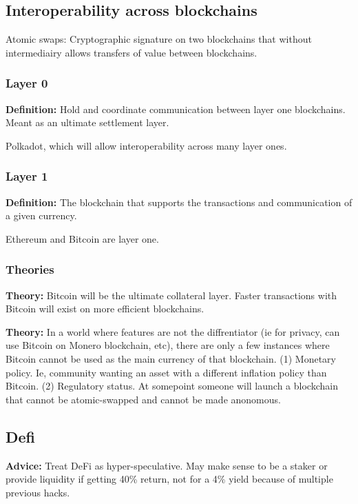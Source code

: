 \documentclass[10pt,twocolumn]{article}
\begin{document}
\subsection{Interoperability across blockchains}
Atomic swaps: Cryptographic signature on two blockchains that without
intermediairy allows transfers of value between blockchains. 

\subsubsection{Layer 0}
\textbf{Definition:} Hold and coordinate communication between layer one
blockchains. Meant as an ultimate settlement layer. 

Polkadot, which will allow interoperability across many layer ones. 

\subsubsection{Layer 1}
\textbf{Definition:} The blockchain that supports the transactions and
communication of a given currency. 

Ethereum and Bitcoin are layer one. 

\subsubsection{Theories}
{\bf Theory:} Bitcoin will be the ultimate collateral layer. Faster transactions
with Bitcoin will exist on more efficient blockchains. 

\textbf{Theory:} In a world where features are not the diffrentiator (ie for
privacy, can use Bitcoin on Monero blockchain, etc), there are only a few
instances where Bitcoin cannot be used as the main currency of that blockchain.
(1) Monetary policy. Ie, community wanting an asset with a different inflation
policy than Bitcoin. (2) Regulatory status. At somepoint someone will launch a
blockchain that cannot be atomic-swapped and cannot be made anonomous. 

\subsection{Defi} %

\textbf{Advice:} Treat DeFi as hyper-speculative. May make sense to be a staker or
provide liquidity if getting 40\% return, not for a 4\% yield because of
multiple previous hacks. 
\end{document}
